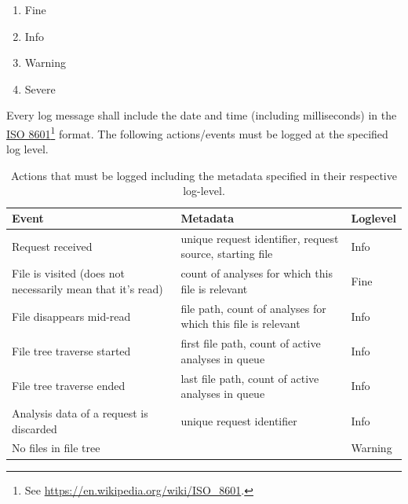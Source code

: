 \documentclass[11pt]{article} %
\begin{document}
    \begin{enumerate}
        \item Fine
        \item Info
        \item Warning
        \item Severe
    \end{enumerate}

    Every log message shall include the date and time (including milliseconds) in the \href{https://en.wikipedia.org/wiki/ISO_8601}{ISO 8601}\footnote{See \url{https://en.wikipedia.org/wiki/ISO_8601}.} format. The following actions/events must be logged at the specified log level.

    \begin{table}[H]
        \centering
        \begin{tabular}{p{.2\linewidth} | p{.5\linewidth} | p{.2\linewidth}}
            \textbf{Event}                                             & \textbf{Metadata}                                            & \textbf{Loglevel} \\\hline
            Request received                                           & unique request identifier, request source, starting file     & Info              \\\hline
            File is visited (does not necessarily mean that it's read) & count of analyses for which this file is relevant                     & Fine              \\\hline
            File disappears mid-read                                   & file path, count of analyses for which this file is relevant                     & Info              \\\hline
            File tree traverse started                                 & first file path, count of active analyses in queue           & Info              \\\hline
            File tree traverse ended                                   & last file path, count of active analyses in queue            & Info              \\\hline
            Analysis data of a request is discarded                    & unique request identifier                                    & Info              \\\hline
            No files in file tree                                      &                                                              & Warning
        \end{tabular}
        \caption{Actions that must be logged including the metadata specified in their respective log-level.}
        \label{tab:log_actions}
    \end{table}
\end{document}

